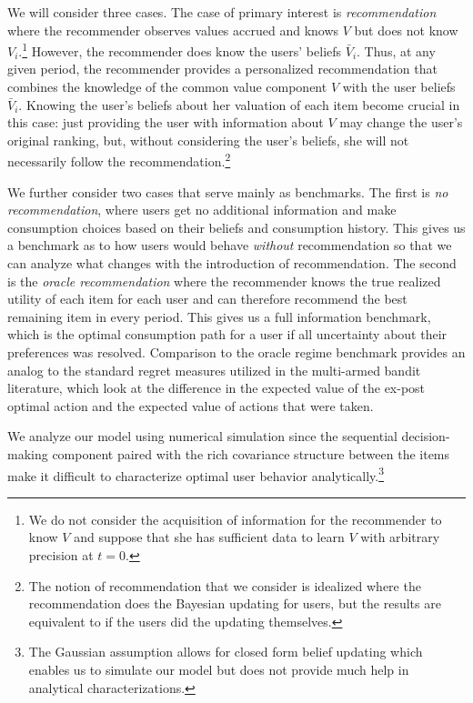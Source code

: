 \documentclass[manuscript, nonacm]{acmart}
\newcommand{\xhdr}[1]{\vspace{1mm} \noindent{\bf #1}}
\begin{document}
We will consider three cases. The case of primary interest is \textit{recommendation} where the recommender observes values accrued and knows $V$ but does not know $V_i$.\footnote{We do not consider the acquisition of information for the recommender to know $V$ and suppose that she has sufficient data to learn $V$ with arbitrary precision at $t = 0$.} However, the recommender does know the users' beliefs $\bar V_i$. Thus, at any given period, the recommender provides a personalized recommendation that combines the knowledge of the common value component $V$ with the user beliefs $\bar V_i$. Knowing the user's beliefs about her valuation of each item become crucial in this case: just providing the user with information about $V$ may change the user's original ranking, but, without considering the user's beliefs, she will not necessarily follow the recommendation.\footnote{The notion of recommendation that we consider is idealized where the recommendation does the Bayesian updating for users, but the results are equivalent to if the users did the updating themselves.}
\par

We further consider two cases that serve mainly as benchmarks. The first is \textit{no recommendation}, where users get no additional information and make consumption choices based on their beliefs and consumption history. This gives us a benchmark as to how users would behave \textit{without} recommendation so that we can analyze what changes with the introduction of recommendation. The second is the \textit{oracle recommendation} where the recommender knows the true realized utility of each item for each user and can therefore recommend the best remaining item in every period. This gives us a full information benchmark, which is the optimal consumption path for a user if all uncertainty about their preferences was resolved. Comparison to the oracle regime benchmark provides an analog to the standard regret measures utilized in the multi-armed bandit literature, which look at the difference in the expected value of the ex-post optimal action and the expected value of actions that were taken.
\par

\xhdr{Simulation Details.}
We analyze our model using numerical simulation since the sequential decision-making component paired with the rich covariance structure between the items make it difficult to characterize optimal user behavior analytically.\footnote{The Gaussian assumption allows for closed form belief updating which enables us to simulate our model but does not provide much help in analytical characterizations.}
\par
\end{document}
